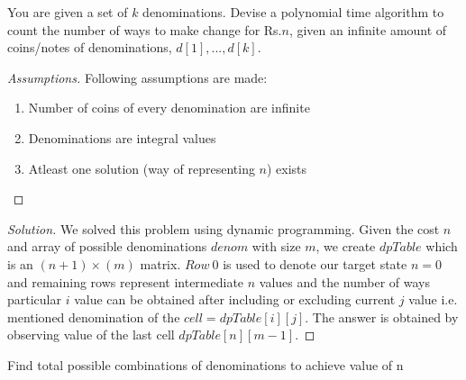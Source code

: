 \begin{solution}{4.1}
    \begin{question}
        You are given a set of $k$ denominations. Devise a polynomial time algorithm to count the number of ways to make change for Rs.$n$, given an infinite amount of coins/notes of denominations, $d[1], . . . , d[k]$.
    \end{question}
    \tcblower{}
    \begin{proof}[Assumptions]
    Following assumptions are made:
        \begin{enumerate}
            \item Number of coins of every denomination are infinite
            \item Denominations are integral values
            \item Atleast one solution (way of representing $n$) exists
        \end{enumerate}
    \end{proof}
    \begin{proof}[Solution]
        We solved this problem using dynamic programming. Given the cost $n$ and array of possible denominations $denom$ with size $m$, we create $dpTable$ which is an $(n+1)\times(m)$ matrix. $Row \ 0$ is used to denote our target state $n=0$ and remaining rows represent intermediate $n$ values and the number of ways particular $i$ value can be obtained after including or excluding current $j$ value i.e. mentioned denomination of the $cell=dpTable[i][j]$.
        The answer is obtained by observing value of the last cell $dpTable[n][m-1]$.
    \end{proof}
    \begin{algorithm}[H]
        \caption{Find total possible combinations of denominations to achieve value of n}
        \begin{algorithmic}
        \end{algorithmic}
    \end{algorithm}

\end{solution}